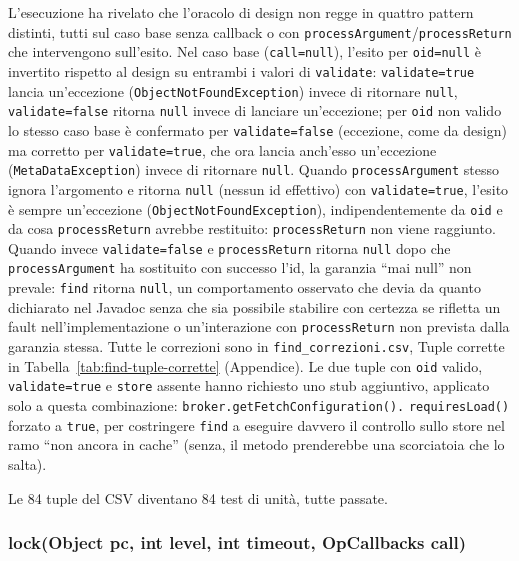 L'esecuzione ha rivelato che l'oracolo di design non regge in quattro pattern distinti, tutti
sul caso base senza callback o con \texttt{processArgument}/\texttt{processReturn} che
intervengono sull'esito. Nel caso base (\texttt{call=null}), l'esito per \texttt{oid=null} è
invertito rispetto al design su entrambi i valori di \texttt{validate}: \texttt{validate=true}
lancia un'eccezione (\texttt{ObjectNotFoundException}) invece di ritornare \texttt{null},
\texttt{validate=false} ritorna \texttt{null} invece di lanciare un'eccezione; per \texttt{oid}
non valido lo stesso caso base è confermato per \texttt{validate=false} (eccezione, come da
design) ma corretto per \texttt{validate=true}, che ora lancia anch'esso un'eccezione
(\texttt{MetaDataException}) invece di ritornare \texttt{null}. Quando \texttt{processArgument}
stesso ignora l'argomento e ritorna \texttt{null} (nessun id effettivo) con
\texttt{validate=true}, l'esito è sempre un'eccezione (\texttt{ObjectNotFoundException}),
indipendentemente da \texttt{oid} e da cosa \texttt{processReturn} avrebbe restituito:
\texttt{processReturn} non viene raggiunto. Quando invece \texttt{validate=false} e
\texttt{processReturn} ritorna \texttt{null} dopo che \texttt{processArgument} ha sostituito con
successo l'id, la garanzia ``mai null'' non prevale: \texttt{find} ritorna \texttt{null}, un
comportamento osservato che devia da quanto dichiarato nel Javadoc senza che sia possibile
stabilire con certezza se rifletta un fault nell'implementazione o un'interazione con
\texttt{processReturn} non prevista dalla garanzia stessa. Tutte le correzioni sono in
\texttt{find\_correzioni.csv}, Tuple corrette in Tabella~\ref{tab:find-tuple-corrette}
(Appendice). Le due tuple con
\texttt{oid} valido, \texttt{validate=true} e \texttt{store} assente hanno richiesto uno stub
aggiuntivo, applicato solo a questa combinazione: \texttt{broker.getFetchConfiguration().}
\texttt{requiresLoad()} forzato a \texttt{true}, per costringere \texttt{find} a eseguire davvero
il controllo sullo store nel ramo ``non ancora in cache'' (senza, il metodo prenderebbe una
scorciatoia che lo salta).

Le 84 tuple del CSV diventano 84 test di unità, tutte passate.

\subsubsection{lock(Object pc, int level, int timeout, OpCallbacks call)}

